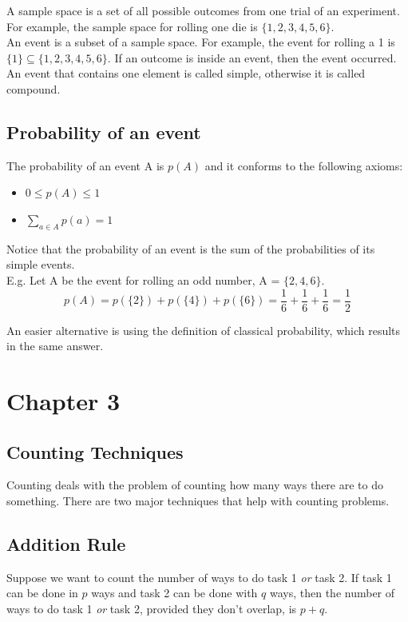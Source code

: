 \documentclass[12pt, letterpaper]{article}
\begin{document}
A sample space is a set of all possible outcomes from one trial of an experiment.
For example, the sample space for rolling one die is \(\{1, 2, 3, 4, 5, 6\}\).\\

An event is a subset of a sample space.
For example, the event for rolling a 1 is \( \{1\} \subseteq \{1, 2, 3, 4, 5, 6\}\).
If an outcome is inside an event, then the event occurred. An event that contains 
one element is called simple, otherwise it is called compound.

\subsection{Probability of an event}
The probability of an event A is \(p\left(A\right)\) and it conforms to the following axioms:

\begin{itemize}
\item \(0 \leq p\left(A\right) \leq 1\)
\item \(\sum\limits_{a \in A} p\left(a\right) = 1\)
\end{itemize}

Notice that the probability of an event is the sum of the probabilities of its simple
events.\\

E.g. Let A be the event for rolling an odd number, A = \( \{2, 4, 6\} \).
\[
	p\left(A\right) = p\left(\{2\}\right) + p\left(\{4\}\right) + p\left(\{6\}\right) = \frac{1}{6} + \frac{1}{6} + \frac{1}{6} = \frac{1}{2}
\]

An easier alternative is using the definition of classical probability, which results in
the same answer.

\newpage

\section{Chapter 3}
\subsection{Counting Techniques}
Counting deals with the problem of counting how many ways there are to do something.
There are two major techniques that help with counting problems.

\subsection{Addition Rule}
Suppose we want to count the number of ways to do task 1 \emph{or} task 2. If task 1 can
be done in \(p\) ways and task 2 can be done with \(q\) ways, then the number of ways to
do task 1 \emph{or} task 2, provided they don't overlap, is \(p + q\).\\
\end{document}
